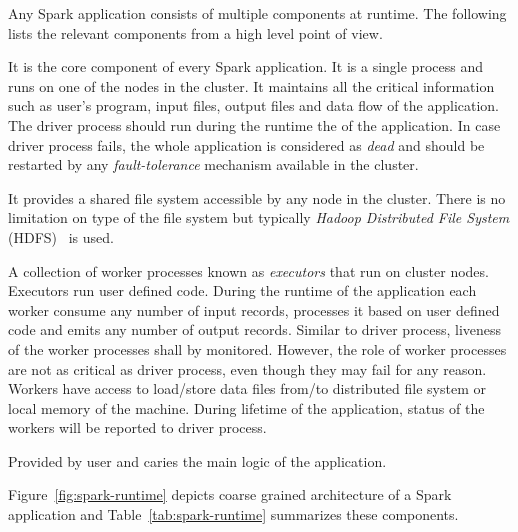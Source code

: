 Any Spark application consists of multiple components at runtime. The following lists the relevant components from a high level point of view.
\begin{description}[leftmargin=0pt]
    \item[Driver Process] It is the core component of every Spark application. It is a single process and runs on one of the nodes in the cluster. It maintains all the critical information such as user's program, input files, output files and data flow of the application. The driver process should run during the runtime the of the application. In case driver process fails, the whole application is considered as \emph{dead} and should be restarted by any \emph{fault-tolerance} mechanism available in the cluster.
    \item[Distributed File System] It provides a shared file system accessible by any node in the cluster. There is no limitation on type of the file system but typically \emph{Hadoop Distributed File System} (HDFS)~\cite{hadoop} is used.
    \item[Worker Processes] A collection of worker processes known as \emph{executors} that run on cluster nodes. Executors run user defined code. During the runtime of the application each worker consume any number of input records, processes it based on user defined code and emits any number of output records. Similar to driver process, liveness of the worker processes shall by monitored. However, the role of worker processes are not as critical as driver process, even though they may fail for any reason. Workers have access to load/store data files from/to distributed file system or local memory of the machine. During lifetime of the application, status of the workers will be reported to driver process.
    \item[User Defined Code] Provided by user and caries the main logic of the application.
\end{description}
Figure~\ref{fig:spark-runtime} depicts coarse grained architecture of a Spark application and Table~\ref{tab:spark-runtime} summarizes these components.
